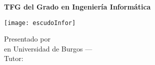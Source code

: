 \renewcommand\maketitle{
    \thispagestyle{empty}

    \cabecera
    \vfill

    \begin{minipage}{0.74\textwidth}
        \begin{tcolorbox}[
                colback=blue!10,
                colframe=blue!20!black!40,
                top=16pt,
                bottom=16pt
            ]
            \begin{center}
                \textbf{\large TFG del Grado en Ingeniería Informática}

                \bigbreak

                \textbf{\LARGE\thetitle}
            \end{center}
        \end{tcolorbox}
    \end{minipage}
    \hfill
    \begin{minipage}{0.2\textwidth}
        \texttt{[image: escudoInfor]}
    \end{minipage}


    \vfill

    \begin{center}
        \noindent\LARGE
        Presentado por \theauthor\\
        en Universidad de Burgos --- \thedate\\
        Tutor: \thetutor\\
    \end{center}

    \clearpage
}
\maketitle
